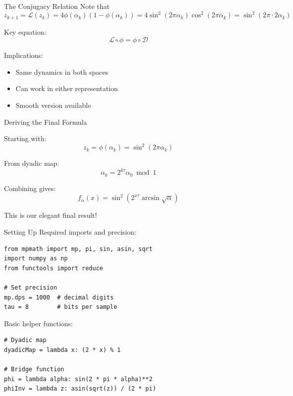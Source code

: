 \documentclass[10pt]{beamer}
\begin{document}
\begin{frame}{The Conjugacy Relation}
Note that 
\[ z_{k+1} = \mathcal{L}(z_k) = 4\phi(\alpha_k)(1 - \phi(\alpha_k)) = 4\sin^2(2\pi\alpha_k)\cos^2(2\pi\alpha_k) = \sin^2(2\pi\cdot 2\alpha_k)\]

Key equation:
\[ \mathcal{L} \circ \phi = \phi \circ \mathcal{D} \]

\begin{center}
\end{center}

Implications:
\begin{itemize}
\item Same dynamics in both spaces
\item Can work in either representation
\item Smooth version available
\end{itemize}
\end{frame}

\begin{frame}{Deriving the Final Formula}

Starting with:
\[ z_k = \phi(\alpha_k) = \sin^2(2\pi\alpha_k) \]

From dyadic map:
\[ \alpha_k = 2^{k\tau}\alpha_0 \bmod 1 \]

Combining gives:
\[ f_\alpha(x) = \sin^2(2^{x\tau}\arcsin\sqrt{\alpha}) \]

This is our elegant final result!
\end{frame}

\begin{frame}[fragile]{Setting Up}
Required imports and precision:
\begin{lstlisting}
from mpmath import mp, pi, sin, asin, sqrt
import numpy as np
from functools import reduce

# Set precision
mp.dps = 1000  # decimal digits
tau = 8        # bits per sample
\end{lstlisting}

Basic helper functions:
\begin{lstlisting}
# Dyadic map
dyadicMap = lambda x: (2 * x) % 1

# Bridge function
phi = lambda alpha: sin(2 * pi * alpha)**2
phiInv = lambda z: asin(sqrt(z)) / (2 * pi)
\end{lstlisting}
\end{frame}
\end{document}
